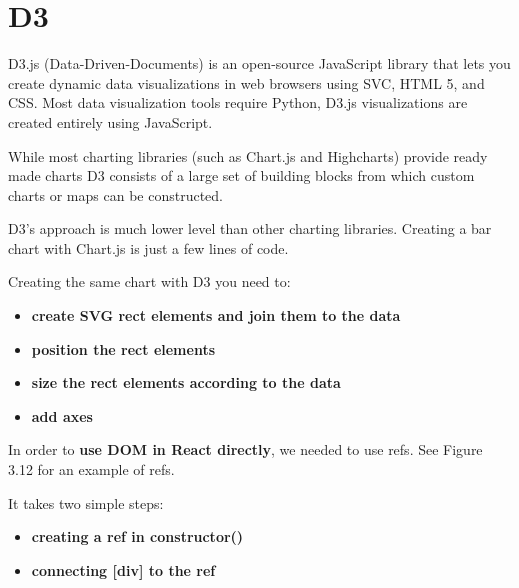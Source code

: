 \vspace{5mm}

\section{D3}

D3.js (Data-Driven-Documents) is an open-source JavaScript library that lets you create dynamic data visualizations in web browsers using SVC, HTML 5, and CSS.
Most data visualization tools require Python, D3.js visualizations are created entirely using JavaScript.

\vspace{5mm}

While most charting libraries (such as Chart.js and Highcharts) provide ready made charts D3 consists of a large set of building blocks from which custom charts or maps can be constructed.

\vspace{2mm}
D3’s approach is much lower level than other charting libraries. Creating a bar chart with Chart.js is just a few lines of code.\cite{d3}

Creating the same chart with D3 you need to:

\begin{itemize}

\item \textbf{create SVG rect elements and join them to the data}
\item \textbf{position the rect elements}
\item \textbf{size the rect elements according to the data}
\item \textbf{add axes}

\end{itemize}


In order to \textbf{use DOM in React directly}, we needed to use refs. See Figure 3.12 for an example of refs.\\

\vspace{10mm}



It takes two simple steps:

\begin{itemize}

\item \textbf{creating a ref in constructor()}
\item \textbf{connecting [div] to the ref}

\end{itemize}


